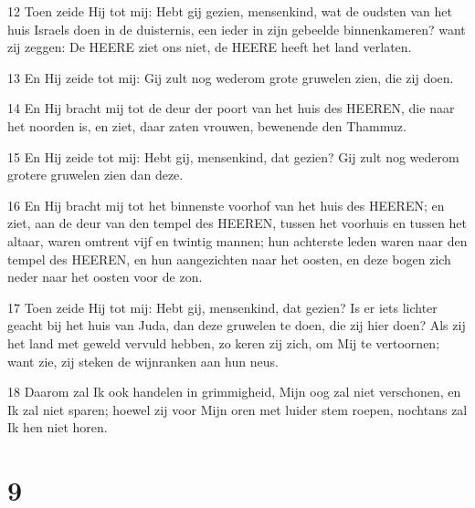 \par 12 Toen zeide Hij tot mij: Hebt gij gezien, mensenkind, wat de oudsten van het huis Israels doen in de duisternis, een ieder in zijn gebeelde binnenkameren? want zij zeggen: De HEERE ziet ons niet, de HEERE heeft het land verlaten.
\par 13 En Hij zeide tot mij: Gij zult nog wederom grote gruwelen zien, die zij doen.
\par 14 En Hij bracht mij tot de deur der poort van het huis des HEEREN, die naar het noorden is, en ziet, daar zaten vrouwen, bewenende den Thammuz.
\par 15 En Hij zeide tot mij: Hebt gij, mensenkind, dat gezien? Gij zult nog wederom grotere gruwelen zien dan deze.
\par 16 En Hij bracht mij tot het binnenste voorhof van het huis des HEEREN; en ziet, aan de deur van den tempel des HEEREN, tussen het voorhuis en tussen het altaar, waren omtrent vijf en twintig mannen; hun achterste leden waren naar den tempel des HEEREN, en hun aangezichten naar het oosten, en deze bogen zich neder naar het oosten voor de zon.
\par 17 Toen zeide Hij tot mij: Hebt gij, mensenkind, dat gezien? Is er iets lichter geacht bij het huis van Juda, dan deze gruwelen te doen, die zij hier doen? Als zij het land met geweld vervuld hebben, zo keren zij zich, om Mij te vertoornen; want zie, zij steken de wijnranken aan hun neus.
\par 18 Daarom zal Ik ook handelen in grimmigheid, Mijn oog zal niet verschonen, en Ik zal niet sparen; hoewel zij voor Mijn oren met luider stem roepen, nochtans zal Ik hen niet horen.

\chapter{9}


